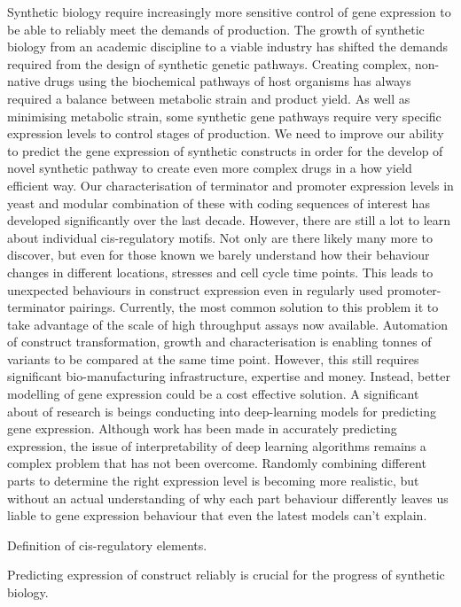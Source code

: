 \documentclass{SBCbookchapter}
\begin{document}
Synthetic biology require increasingly more sensitive control of gene expression to be able to reliably meet the demands of production. The growth of synthetic biology from an academic discipline to a viable industry has shifted the demands required from the design of synthetic genetic pathways. Creating complex, non-native drugs using the biochemical pathways of host organisms has always required a balance between metabolic strain and product yield. As well as minimising metabolic strain, some synthetic gene pathways require very specific expression levels to control stages of production. We need to improve our ability to predict the gene expression of synthetic constructs in order for the develop of novel synthetic pathway to create even more complex drugs in a how yield efficient way. Our characterisation of terminator and promoter expression levels in yeast and modular combination of these with coding sequences of interest has developed significantly over the last decade. However, there are still a lot to learn about individual cis-regulatory motifs. Not only are there likely many more to discover, but even for those known we barely understand how their behaviour changes in different locations, stresses and cell cycle time points. This leads to unexpected behaviours in construct expression even in regularly used promoter-terminator pairings. Currently, the most common solution to this problem it to take advantage of the scale of high throughput assays now available. Automation of construct transformation, growth and characterisation is enabling tonnes of variants to be compared at the same time point. However, this still requires significant bio-manufacturing infrastructure, expertise and money. Instead, better modelling of gene expression could be a cost effective solution. A significant about of research is beings conducting into deep-learning models for predicting gene expression. Although work has been made in accurately predicting expression, the issue of interpretability of deep learning algorithms remains a complex problem that has not been overcome. Randomly combining different parts to determine the right expression level is becoming more realistic, but without an actual understanding of why each part behaviour differently leaves us liable to gene expression behaviour that even the latest models can't explain.  

Definition of cis-regulatory elements.

Predicting expression of construct reliably is crucial for the progress of synthetic biology.
\end{document}
